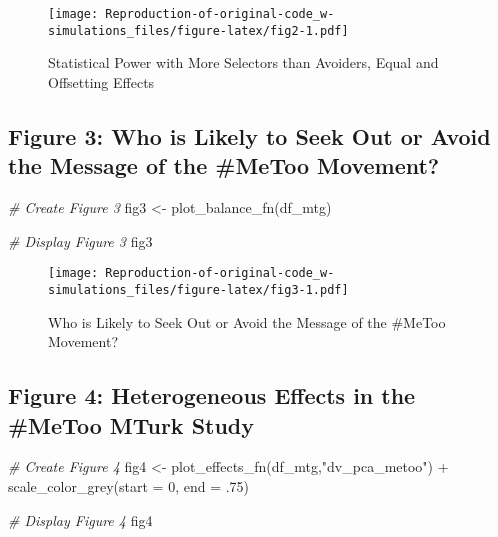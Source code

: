 \documentclass[
]{article}
\newenvironment{Shaded}{\begin{snugshade}}{\end{snugshade}}
\newcommand{\AttributeTok}[1]{\textcolor[rgb]{0.77,0.63,0.00}{#1}}
\newcommand{\CommentTok}[1]{\textcolor[rgb]{0.56,0.35,0.01}{\textit{#1}}}
\newcommand{\DecValTok}[1]{\textcolor[rgb]{0.00,0.00,0.81}{#1}}
\newcommand{\FunctionTok}[1]{\textcolor[rgb]{0.00,0.00,0.00}{#1}}
\newcommand{\NormalTok}[1]{#1}
\newcommand{\OtherTok}[1]{\textcolor[rgb]{0.56,0.35,0.01}{#1}}
\newcommand{\SpecialCharTok}[1]{\textcolor[rgb]{0.00,0.00,0.00}{#1}}
\newcommand{\StringTok}[1]{\textcolor[rgb]{0.31,0.60,0.02}{#1}}
\begin{document}
\begin{figure}
\centering
\texttt{[image: Reproduction-of-original-code\_w-simulations\_files/figure-latex/fig2-1.pdf]}
\caption{Statistical Power with More Selectors than Avoiders, Equal and
Offsetting Effects}
\end{figure}

\hypertarget{figure-3-who-is-likely-to-seek-out-or-avoid-the-message-of-the-metoo-movement}{%
\subsection{Figure 3: Who is Likely to Seek Out or Avoid the Message of
the \#MeToo
Movement?}\label{figure-3-who-is-likely-to-seek-out-or-avoid-the-message-of-the-metoo-movement}}

\begin{Shaded}
\begin{Highlighting}[]
\CommentTok{\# Create Figure 3}
\NormalTok{fig3 }\OtherTok{\textless{}{-}} \FunctionTok{plot\_balance\_fn}\NormalTok{(df\_mtg)}

\CommentTok{\# Display Figure 3}
\NormalTok{fig3}
\end{Highlighting}
\end{Shaded}

\begin{figure}
\centering
\texttt{[image: Reproduction-of-original-code\_w-simulations\_files/figure-latex/fig3-1.pdf]}
\caption{Who is Likely to Seek Out or Avoid the Message of the \#MeToo
Movement?}
\end{figure}

\hypertarget{figure-4-heterogeneous-effects-in-the-metoo-mturk-study}{%
\subsection{Figure 4: Heterogeneous Effects in the \#MeToo MTurk
Study}\label{figure-4-heterogeneous-effects-in-the-metoo-mturk-study}}

\begin{Shaded}
\begin{Highlighting}[]
\CommentTok{\# Create Figure 4}
\NormalTok{fig4 }\OtherTok{\textless{}{-}} \FunctionTok{plot\_effects\_fn}\NormalTok{(df\_mtg,}\StringTok{"dv\_pca\_metoo"}\NormalTok{) }\SpecialCharTok{+} \FunctionTok{scale\_color\_grey}\NormalTok{(}\AttributeTok{start =} \DecValTok{0}\NormalTok{, }\AttributeTok{end =}\NormalTok{ .}\DecValTok{75}\NormalTok{) }

\CommentTok{\# Display Figure 4}
\NormalTok{fig4}
\end{Highlighting}
\end{Shaded}
\end{document}

